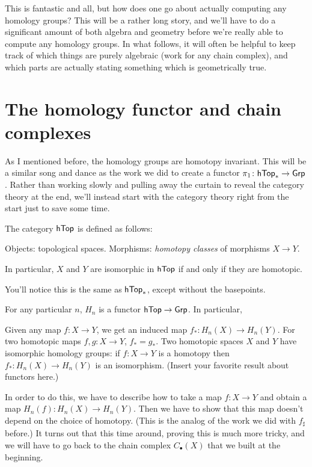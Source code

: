 This is fantastic and all, but how does one go about actually computing any homology groups?
This will be a rather long story, and we'll have to do a significant amount of both algebra and geometry
before we're really able to compute any homology groups.
In what follows, it will often be helpful to keep track of which things are purely algebraic
(work for any chain complex), and which parts are actually stating something which is geometrically true.

\section{The homology functor and chain complexes}
As I mentioned before, the homology groups are homotopy invariant.
This will be a similar song and dance as the work we did to
create a functor $\pi_1 \colon \mathsf{hTop}_\ast \to \mathsf{Grp}$.
Rather than working slowly and pulling away the curtain to reveal the category theory at the end,
we'll instead start with the category theory right from the start just to save some time.

\begin{definition}
	The category $\mathsf{hTop}$ is defined as follows:
	\begin{itemize}
		\ii Objects: topological spaces.
		\ii Morphisms: \emph{homotopy classes} of morphisms $X \to Y$.
	\end{itemize}
	In particular, $X$ and $Y$ are isomorphic in $\mathsf{hTop}$
	if and only if they are homotopic.
\end{definition}
You'll notice this is the same as $\mathsf{hTop}_\ast$,
except without the basepoints.

\begin{theorem}
	\label{thm:Hn_functor}
	For any particular $n$, $H_n$ is a functor $\mathsf{hTop} \to \mathsf{Grp}$.
	In particular,
	\begin{itemize}
		\ii Given any map $f \colon X \to Y$, we get an induced map $f_\ast \colon H_n(X) \to H_n(Y)$.
		\ii For two homotopic maps $f, g \colon X \to Y$, $f_\ast = g_\ast$.
		\ii Two homotopic spaces $X$ and $Y$ have isomorphic homology groups:
		if $f \colon X \to Y$ is a homotopy then $f_\ast \colon H_n(X) \to H_n(Y)$ is an isomorphism.
		\ii (Insert your favorite result about functors here.)
	\end{itemize}
\end{theorem}

In order to do this, we have to describe how to take a map $f \colon X \to Y$
and obtain a map $H_n(f) \colon H_n(X) \to H_n(Y)$.
Then we have to show that this map doesn't depend on the choice of homotopy.
(This is the analog of the work we did with $f_\sharp$ before.)
It turns out that this time around, proving this is much more tricky,
and we will have to go back to the chain complex
$C_\bullet(X)$ that we built at the beginning.

